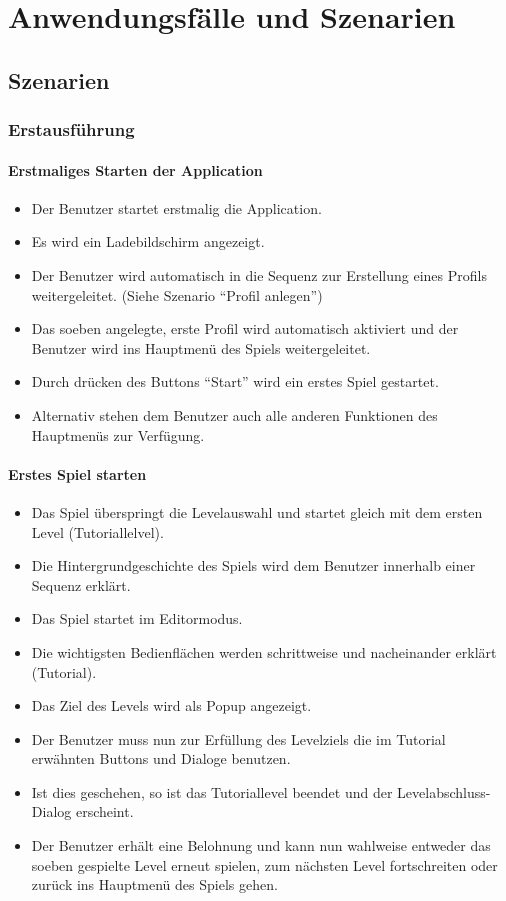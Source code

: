 \section{Anwendungsfälle und Szenarien}

\subsection{Szenarien}

\subsubsection{Erstausführung}
\paragraph{Erstmaliges Starten der Application}
\begin{itemize}
	\item Der Benutzer startet erstmalig die Application.
	\item Es wird ein Ladebildschirm angezeigt.
	\item Der Benutzer wird automatisch in die Sequenz zur Erstellung eines Profils weitergeleitet. (Siehe Szenario "`Profil anlegen"')
	\item Das soeben angelegte, erste Profil wird automatisch aktiviert und der Benutzer wird ins Hauptmenü des Spiels weitergeleitet.
	\item Durch drücken des Buttons "`Start"' wird ein erstes Spiel gestartet.
	\item Alternativ stehen dem Benutzer auch alle anderen Funktionen des Hauptmenüs zur Verfügung.
\end{itemize}
\paragraph{Erstes Spiel starten}
\begin{itemize}
	\item Das Spiel überspringt die Levelauswahl und startet gleich mit dem ersten Level (Tutoriallelvel).
	\item Die Hintergrundgeschichte des Spiels wird dem Benutzer innerhalb einer Sequenz erklärt.
	\item Das Spiel startet im Editormodus.
	\item Die wichtigsten Bedienflächen werden schrittweise und nacheinander erklärt (Tutorial).
	\item Das Ziel des Levels wird als Popup angezeigt.
	\item Der Benutzer muss nun zur Erfüllung des Levelziels die im Tutorial erwähnten Buttons und Dialoge benutzen.
	\item Ist dies geschehen, so ist das Tutoriallevel beendet und der Levelabschluss-Dialog erscheint.
	\item Der Benutzer erhält eine Belohnung und kann nun wahlweise entweder das soeben gespielte Level erneut spielen, zum nächsten Level fortschreiten oder zurück ins Hauptmenü des Spiels gehen.
\end{itemize}

